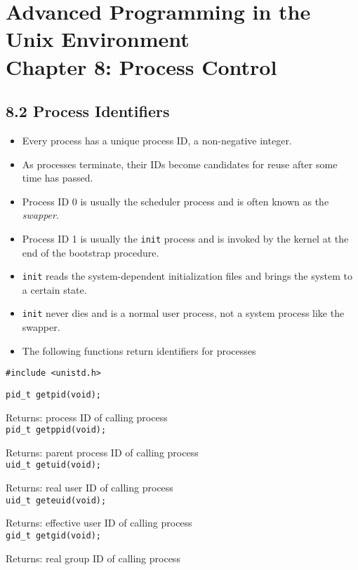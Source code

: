 \documentclass[]{article} \usepackage[all]{xy}
\newcommand{\code}{\texttt}
\begin{document}
\section*{Advanced Programming in the Unix Environment \\
Chapter 8: Process
Control}
\subsection*{8.2 Process Identifiers}
\begin{itemize}
\item Every process has a unique process ID, a non-negative integer.
\item As processes terminate, their IDs become candidates for reuse after some
time has passed.
\item Process ID 0 is usually the scheduler process and is often known as the
\emph{swapper}.
\item Process ID 1 is usually the \code{init} process and is invoked by the
kernel at the end of the bootstrap procedure.
\item \code{init} reads the system-dependent initialization files and brings the
system to a certain state.
\item \code{init} never dies and is a normal user process, not a system process
like the swapper.
\item The following functions return identifiers for processes
\end{itemize}

\code{\#include <unistd.h>}

\code{pid\_t getpid(void);}

Returns: process ID of calling process\\

\code{pid\_t getppid(void);}

Returns: parent process ID of calling process\\

\code{uid\_t getuid(void);}

Returns: real user ID of calling process\\

\code{uid\_t geteuid(void);}

Returns: effective user ID of calling process \\

\code{gid\_t getgid(void);}

Returns: real group ID of calling process\\
\end{document}
